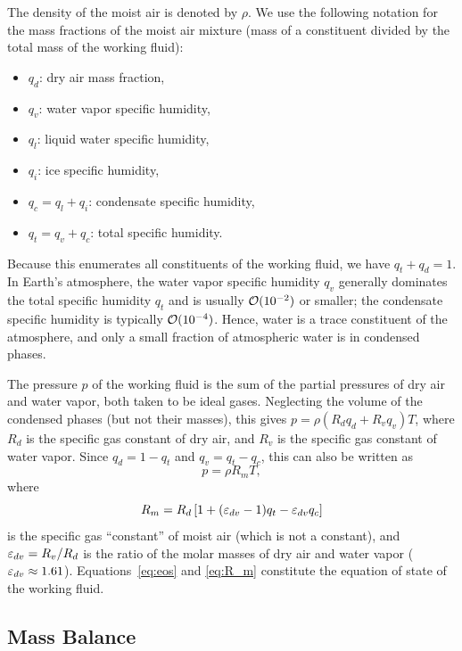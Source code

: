 \documentclass{article}
\begin{document}
The density of the moist air is denoted by $\rho$. We use the following notation for the mass fractions of the moist air mixture (mass of a constituent divided by the total mass of the working fluid):
\begin{itemize}
\item $q_d$: dry air mass fraction,
\item $q_v$: water vapor specific humidity,

\item $q_l$: liquid water specific humidity,
\item $q_i$: ice specific humidity,
\item $q_c = q_l + q_i$: condensate specific humidity,
\item $q_t = q_v + q_c$: total specific humidity.
\end{itemize}
Because this enumerates all constituents of the working fluid, we have $q_t + q_d = 1$. In Earth's atmosphere, the water vapor specific humidity $q_v$ generally dominates the total specific humidity $q_t$ and is usually $\mathcal{O}(10^{-2})$ or smaller; the condensate specific humidity is typically $\mathcal{O}(10^{-4})$. Hence, water is a trace constituent of the atmosphere, and only a small fraction of atmospheric water is in condensed phases. 

The pressure $p$ of the working fluid is the sum of the partial pressures of dry air and water vapor, both taken to be ideal gases. Neglecting the volume of the condensed phases (but not their masses), this gives $p = \rho (R_d q_d + R_v q_v) T$, where $R_d$ is the specific gas constant of dry air, and $R_v$ is the specific gas constant of water vapor. Since $q_d = 1-q_t$ and $q_v = q_t - q_c$, this can also be written as
\begin{equation}
    p = \rho R_m T,
\label{eq:eos}
\end{equation}
where
\begin{equation}
    R_m = R_d \left[1 + (\varepsilon_{dv}-1)q_t - \varepsilon_{dv} q_c\right]
\label{eq:R_m}
\end{equation}
is the specific gas ``constant'' of moist air (which is not a constant), and $\varepsilon_{dv} = R_v/R_d$ is the ratio of the molar masses of dry air and water vapor ($\varepsilon_{dv} \approx 1.61$). Equations~\eqref{eq:eos} and \eqref{eq:R_m} constitute the equation of state of the working fluid.

\subsection{Mass Balance}
\end{document}
